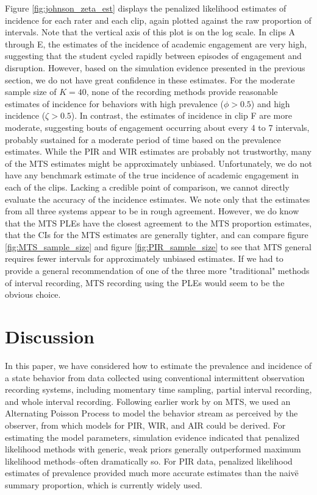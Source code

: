 \documentclass[man, noextraspace, floatsintext]{apa6}\usepackage[]{graphicx}\usepackage[]{color}
\begin{document}
Figure \ref{fig:johnson_zeta_est} displays the penalized likelihood estimates of incidence for each rater and each clip, again plotted against the raw proportion of intervals. Note that the vertical axis of this plot is on the log scale. 
In clips A through E, the estimates of the incidence of academic engagement are very high, suggesting that the student cycled rapidly between episodes of engagement and disruption.
However, based on the simulation evidence presented in the previous section, we do not have great confidence in these estimates.
For the moderate sample size of $K = 40$, none of the recording methods provide reasonable estimates of incidence for behaviors with high prevalence ($\phi > 0.5$) and high incidence ($\zeta > 0.5$). In contrast, the estimates of incidence in clip F are more moderate, suggesting bouts of engagement occurring about every 4 to 7 intervals, probably sustained for a moderate period of time based on the prevalence estimates. While the PIR and WIR estimates are probably not trustworthy, many of the MTS estimates might be approximately unbiased.
Unfortunately, we do not have any benchmark estimate of the true incidence of academic engagement in each of the clips. 
Lacking a credible point of comparison, we cannot directly evaluate the accuracy of the incidence estimates. 
We note only that the estimates from all three systems appear to be in rough agreement. However, we do know that the MTS PLEs have the closest agreement to the MTS proportion estimates, that the CIs for the MTS estimates are generally tighter, and can compare figure \ref{fig:MTS_sample_size} and figure \ref{fig:PIR_sample_size} to see that MTS general requires fewer intervals for approximately unbiased estimates. If we had to provide a general recommendation of one of the three more "traditional" methods of interval recording, MTS recording using the PLEs would seem to be the obvious choice. 

\section{Discussion}
\label{sec:discussion}

In this paper, we have considered how to estimate the prevalence and incidence of a state behavior from data collected using conventional intermittent observation recording systems, including momentary time sampling, partial interval recording, and whole interval recording. Following earlier work by \citet{Brown1977estimation} on MTS, we used an Alternating Poisson Process to model the behavior stream as perceived by the observer, from which models for PIR, WIR, and AIR could be derived. For estimating the model parameters, simulation evidence indicated that penalized likelihood methods with generic, weak priors generally outperformed maximum likelihood methods--often dramatically so. For PIR data, penalized likelihood estimates of prevalence provided much more accurate estimates than the naiv\"e summary proportion, which is currently widely used.
\end{document}

